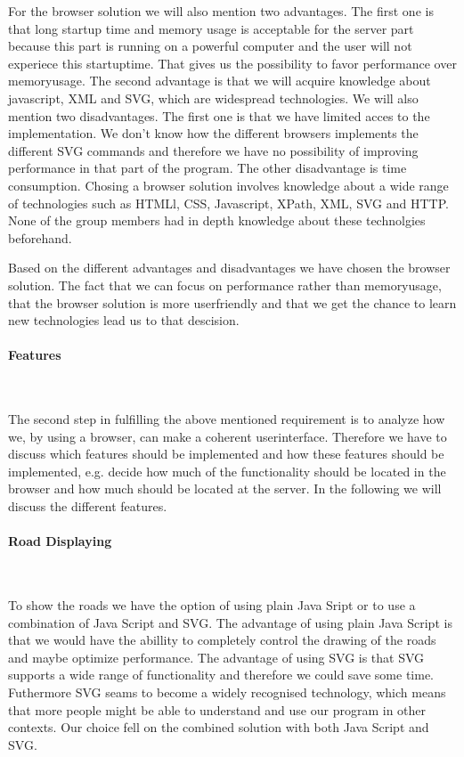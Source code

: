 \documentclass[a4paper,10pt,titlepage]{article}
\begin{document}
For the browser solution we will also mention two advantages. The first one is that long startup time and memory usage is acceptable for the server part because this part is running on a powerful computer and the user will not experiece this startuptime. That gives us the possibility to favor performance over memoryusage. The second advantage is that we will acquire knowledge about javascript, XML and SVG, which are widespread technologies. We will also mention two disadvantages. The first one is that we have limited acces to the implementation. We don't know how the different browsers implements the different SVG commands and therefore we have no possibility of improving performance in that part of the program. The other disadvantage is time consumption. Chosing a browser solution involves knowledge about a wide range of technologies such as HTMLl, CSS, Javascript, XPath, XML, SVG and HTTP. None of the group members had in depth knowledge about these technolgies beforehand.    

Based on the different advantages and disadvantages we have chosen the browser solution. The fact that we can focus on performance rather than memoryusage, that the browser solution is more userfriendly and that we get the chance to learn new technologies lead us to that descision.

\paragraph{Features}\mbox{}\

The second step in fulfilling the above mentioned requirement is to analyze how we, by using a browser, can make a coherent userinterface. Therefore we have to discuss which features should be implemented and how these features should be implemented, e.g. decide how much of the functionality should be located in the browser and how much should be located at the server. In the following we will discuss the different features.

\paragraph{Road Displaying}\mbox{}\

To show the roads we have the option of using plain Java Sript or to use a combination of Java Script and SVG. The advantage of using plain Java Script is that we would have the abillity to completely control the drawing of the roads and maybe optimize performance. The advantage of using SVG is that SVG supports a wide range of functionality and therefore we could save some time. Futhermore SVG seams to become a widely recognised technology, which means that more people might be able to understand and use our program in other contexts. Our choice fell on the combined solution with both Java Script and SVG. 
 
\end{document}

